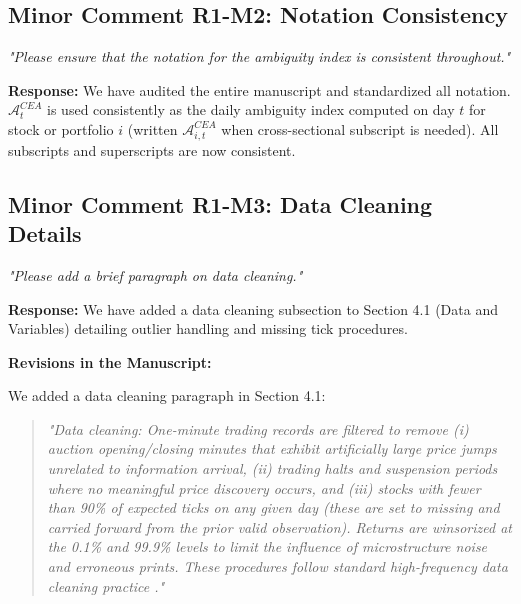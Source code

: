 \documentclass[12pt]{article}
\begin{document}
\subsection*{Minor Comment R1-M2: Notation Consistency}
\textit{"Please ensure that the notation for the ambiguity index is consistent throughout."}

\begin{highlightbox}
\textbf{Response:} We have audited the entire manuscript and standardized all notation. $\mathcal{A}^{CEA}_t$ is used consistently as the daily ambiguity index computed on day $t$ for stock or portfolio $i$ (written $\mathcal{A}^{CEA}_{i,t}$ when cross-sectional subscript is needed). All subscripts and superscripts are now consistent.
\end{highlightbox}

\subsection*{Minor Comment R1-M3: Data Cleaning Details}
\textit{"Please add a brief paragraph on data cleaning."}

\begin{highlightbox}
\textbf{Response:} We have added a data cleaning subsection to Section 4.1 (Data and Variables) detailing outlier handling and missing tick procedures.
\end{highlightbox}

\begin{highlightbox}
\textbf{Revisions in the Manuscript:}

We added a data cleaning paragraph in Section 4.1:
\vspace{0.2cm}
\begin{quote}
\itshape "Data cleaning: One-minute trading records are filtered to remove (i) auction opening/closing minutes that exhibit artificially large price jumps unrelated to information arrival, (ii) trading halts and suspension periods where no meaningful price discovery occurs, and (iii) stocks with fewer than 90\% of expected ticks on any given day (these are set to missing and carried forward from the prior valid observation). Returns are winsorized at the 0.1\% and 99.9\% levels to limit the influence of microstructure noise and erroneous prints. These procedures follow standard high-frequency data cleaning practice \citep[][Section 2]{fan2019measurement}."
\end{quote}
\end{highlightbox}
\end{document}
